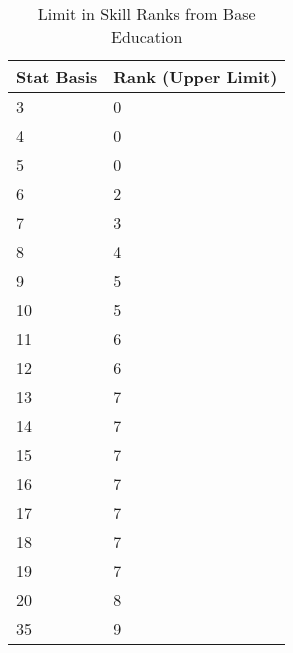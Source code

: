 
\begin{table}[h]
\centering
\caption{Limit in Skill Ranks from Base Education}
	\begin{tabular}{||l|l||} \hline
	Stat Basis & Rank (Upper Limit) \\ \hline
	3          & 0 \\
	4          & 0 \\
    5          & 0 \\
    6          & 2 \\     	
    7          & 3 \\
    8          & 4 \\
    9          & 5 \\
    10         & 5 \\
    11         & 6 \\
    12         & 6 \\
    13         & 7 \\
    14         & 7 \\
    15         & 7 \\
    16         & 7 \\
    17         & 7 \\
    18         & 7 \\
    19         & 7 \\
    20         & 8 \\
    35         & 9 \\ \hline
	\end{tabular}
\end{table}
